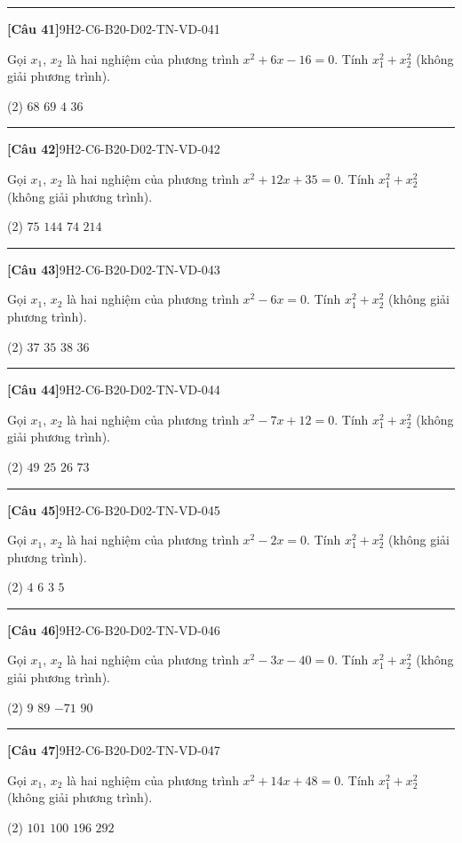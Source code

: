 \documentclass[12pt,a4paper]{article}
\newif\ifloigiai
\newenvironment{cauhoi}[2]{%
  \par\medskip\noindent\rule{\textwidth}{0.4pt}\par\nopagebreak
  \noindent\textbf{[#1]}\hfill{\scriptsize\ttfamily #2}\par\nopagebreak\smallskip}{\par}
\newcommand{\dapan}[1]{\ifloigiai\par\smallskip\noindent\textit{Đáp án:} \textbf{#1}\par\fi}
\begin{document}
\begin{cauhoi}{Câu 41}{9H2-C6-B20-D02-TN-VD-041}
Gọi $x_1$, $x_2$ là hai nghiệm của phương trình $x^{2}+6x-16=0$. Tính $x_1^{2}+x_2^{2}$ (không giải phương trình).
\begin{tasks}(2)
\task $68$
\task $69$
\task $4$
\task $36$
\end{tasks}
\dapan{A}
\end{cauhoi}
\begin{cauhoi}{Câu 42}{9H2-C6-B20-D02-TN-VD-042}
Gọi $x_1$, $x_2$ là hai nghiệm của phương trình $x^{2}+12x+35=0$. Tính $x_1^{2}+x_2^{2}$ (không giải phương trình).
\begin{tasks}(2)
\task $75$
\task $144$
\task $74$
\task $214$
\end{tasks}
\dapan{C}
\end{cauhoi}
\begin{cauhoi}{Câu 43}{9H2-C6-B20-D02-TN-VD-043}
Gọi $x_1$, $x_2$ là hai nghiệm của phương trình $x^{2}-6x=0$. Tính $x_1^{2}+x_2^{2}$ (không giải phương trình).
\begin{tasks}(2)
\task $37$
\task $35$
\task $38$
\task $36$
\end{tasks}
\dapan{D}
\end{cauhoi}
\begin{cauhoi}{Câu 44}{9H2-C6-B20-D02-TN-VD-044}
Gọi $x_1$, $x_2$ là hai nghiệm của phương trình $x^{2}-7x+12=0$. Tính $x_1^{2}+x_2^{2}$ (không giải phương trình).
\begin{tasks}(2)
\task $49$
\task $25$
\task $26$
\task $73$
\end{tasks}
\dapan{B}
\end{cauhoi}
\begin{cauhoi}{Câu 45}{9H2-C6-B20-D02-TN-VD-045}
Gọi $x_1$, $x_2$ là hai nghiệm của phương trình $x^{2}-2x=0$. Tính $x_1^{2}+x_2^{2}$ (không giải phương trình).
\begin{tasks}(2)
\task $4$
\task $6$
\task $3$
\task $5$
\end{tasks}
\dapan{A}
\end{cauhoi}
\begin{cauhoi}{Câu 46}{9H2-C6-B20-D02-TN-VD-046}
Gọi $x_1$, $x_2$ là hai nghiệm của phương trình $x^{2}-3x-40=0$. Tính $x_1^{2}+x_2^{2}$ (không giải phương trình).
\begin{tasks}(2)
\task $9$
\task $89$
\task $-71$
\task $90$
\end{tasks}
\dapan{B}
\end{cauhoi}
\begin{cauhoi}{Câu 47}{9H2-C6-B20-D02-TN-VD-047}
Gọi $x_1$, $x_2$ là hai nghiệm của phương trình $x^{2}+14x+48=0$. Tính $x_1^{2}+x_2^{2}$ (không giải phương trình).
\begin{tasks}(2)
\task $101$
\task $100$
\task $196$
\task $292$
\end{tasks}
\dapan{B}
\end{cauhoi}
\end{document}
